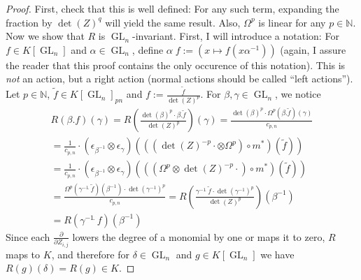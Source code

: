 \begin{proof}
  First, check that this is well defined:
  For any such term, expanding the fraction by $ \operatorname{det} (Z)^q $ will yield the same result.
  Also, $\Omega^p$ is linear for any $p \in \mathbb{N}$.
  Now we show that $R$ is $\operatorname{GL}_n$-invariant.
  First, I will introduce a notation:
  For $f \in K \left\lbrack \operatorname{GL}_n \right\rbrack $ and $\alpha \in \operatorname{GL}_n$, define $ \alpha \dot{\phantom{.}} f := \left( x \mapsto f \left( x \alpha^{-1} \right) \right) $ (again, I assure the reader that this proof contains the only occurence of this notation).
  This is \textit{not} an action, but a right action (normal actions should be called ``left actions'').
  Let $p \in \mathbb{N}$, $ \tilde{f} \in K \left\lbrack \operatorname{GL}_n \right\rbrack_{pn} $ and $ f := \frac{\tilde{f}}{\operatorname{det}(Z)^p} $.
  For $ \beta , \gamma \in \operatorname{GL}_n $, we notice
  \begin{equation}
    \begin{aligned}
      R \left( \beta . f \right) (\gamma)
      = R \left( \frac{ \operatorname{det} (\beta)^p \cdot \beta . \tilde{f}}{\operatorname{det} (Z)^p} \right) (\gamma)
      = \frac{ \operatorname{det} (\beta)^p \cdot \Omega^p \left( \beta . \tilde{f} \right) (\gamma) }{ c_{p,n} } \\
      = \frac{1}{c_{p,n}} \cdot \left( \epsilon_{\beta^{-1}} \otimes \epsilon_\gamma \right) \left( \left( \left( \operatorname{det}(Z)^{-p} \cdot \otimes \Omega^p \right) \circ m^\ast \right) \left( \tilde{f} \right) \right) \\
      = \frac{1}{c_{p,n}} \cdot \left( \epsilon_{\beta^{-1}} \otimes \epsilon_\gamma \right) \left( \left( \left( \Omega^p \otimes \operatorname{det}(Z)^{-p} \cdot \right) \circ m^\ast \right) \left( \tilde{f} \right) \right) \\
      = \frac{ \Omega^p \left( \gamma^{-1} \dot{\phantom{.}} \tilde{f} \right) (\beta^{-1}) \cdot \operatorname{det} \left (\gamma^{-1} \right)^p }{ c_{p,n} }
      = R \left( \frac{ \gamma^{-1} \dot{\phantom{.}} \tilde{f} \cdot \operatorname{det} \left( \gamma^{-1} \right)^p }{\operatorname{det} (Z)^p} \right) \left( \beta^{-1} \right) \\
      = R \left( \gamma^{-1} \dot{\phantom{.}} f \right) \left( \beta^{-1} \right)
    \end{aligned}
  \end{equation}
  Since each $ \frac {\partial}{ \partial Z_{i,j} } $ lowers the degree of a monomial by one or maps it to zero, $R$ maps to $K$, and therefore for $ \delta \in \operatorname{GL}_n $ and $ g \in K \left\lbrack \operatorname{GL}_n \right\rbrack $ we have $ R(g)(\delta) = R(g) \in K $.

\end{proof}

